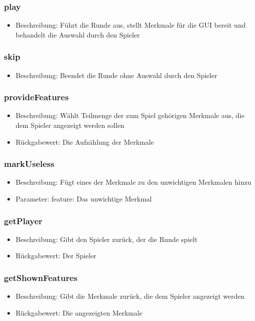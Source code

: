 \documentclass[a4paper]{scrreprt}
\begin{document}
	\subsubsection{play}
	\begin{itemize}
		\item Beschreibung: Führt die Runde aus, stellt Merkmale für die GUI bereit und behandelt die Auswahl durch den Spieler
	\end{itemize}
	\subsubsection{skip}
	\begin{itemize}
		\item Beschreibung: Beendet die Runde ohne Auswahl durch den Spieler
	\end{itemize}
	\subsubsection{provideFeatures}
	\begin{itemize}
		\item Beschreibung: Wählt Teilmenge der zum Spiel gehörigen Merkmale aus, die dem Spieler angezeigt werden sollen
		\item Rückgabewert: Die Aufzählung der Merkmale
	\end{itemize}
	\subsubsection{markUseless}
	\begin{itemize}
		\item Beschreibung: Fügt eines der Merkmale zu den unwichtigen Merkmalen hinzu
		\item Parameter: feature: Das unwichtige Merkmal
	\end{itemize}
	\subsubsection{getPlayer}
	\begin{itemize}
		\item Beschreibung: Gibt den Spieler zurück, der die Runde spielt
		\item Rückgabewert: Der Spieler
	\end{itemize}
	\subsubsection{getShownFeatures}
	\begin{itemize}
		\item Beschreibung: Gibt die Merkmale zurück, die dem Spieler angezeigt werden
		\item Rückgabewert: Die angezeigten Merkmale
	\end{itemize}
\end{document}
